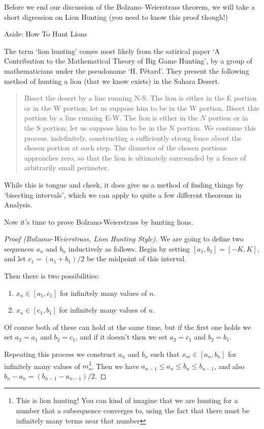 \documentclass[a4paper]{scrartcl}
\begin{document}
Before we end our discussion of the Bolzano–Weierstrass theorem, we will take a short digression on Lion Hunting (you need to know this proof though!)


\begin{aside}{Aside: How To Hunt Lions}

	The term `lion hunting' comes most likely from the satirical paper `A Contribution to the Mathematical Theory of Big Game Hunting', by a group of mathematicians under the pseudoname `H. Pétard'. They present the following method of hunting a lion (that we know exists) in the Sahara Desert.

	\begin{quote}
		Bisect the desert by a line running N-S. The lion is either in the E portion or in the W portion; let us suppose him to be in the W portion. Bisect this portion by a line running E-W. The lion is either in the $N$ portion or in the S portion; let us suppose him to be in the N portion. We continue this process. indefinitely, constructing a sufficiently strong fence about the chosen portion at each step. The diameter of the chosen portions approaches zero, so that the lion is ultimately surrounded by a fence of arbitrarily small perimeter.
	\end{quote}
	While this is tongue and cheek, it does give us a method of finding things by `bisecting intervals', which we can apply to quite a few different theorems in Analysis. 

	Now it's time to prove Bolzano-Weierstrass by hunting lions.


\begin{proof}[Proof (Bolzano-Weierstrass, Lion Hunting Style)]
	We are going to define two sequences $a_n$ and $b_n$ inductively as follows. Begin by setting $[a_1, b_1] = [-K, K]$, and let $c_1 = (a_1 + b_1)/2$ be the midpoint of this interval.

	Then there is two possibilities:
	\begin{enumerate}
		\item $x_n \in [a_1, c_1]$ for infinitely many values of $n$.
		\item $x_n \in [c_1, b_1]$ for infinitely many values of $n$.
	\end{enumerate}
	Of course both of these can hold at the same time, but if the first one holds we set $a_2 = a_1$ and $b_2 = c_1$, and if it doesn't then we set $a_2 = c_1$ and $b_2 = b_1$.

	Repeating this process we construct $a_n$ and $b_n$ such that $x_m \in [a_n, b_n]$ for infinitely many values of $m$\footnote{This is lion hunting! You can kind of imagine that we are hunting for a number that a subsequence converges to, using the fact that there must be infinitely many terms near that number}.
	Then we have $a_{n - 1} \leq a_n \leq b_n \leq b_{n - 1}$, and also $b_n - a_n = (b_{n - 1} - a_{n - 1})/2$. 


\end{proof}
\end{aside}
\end{document}

